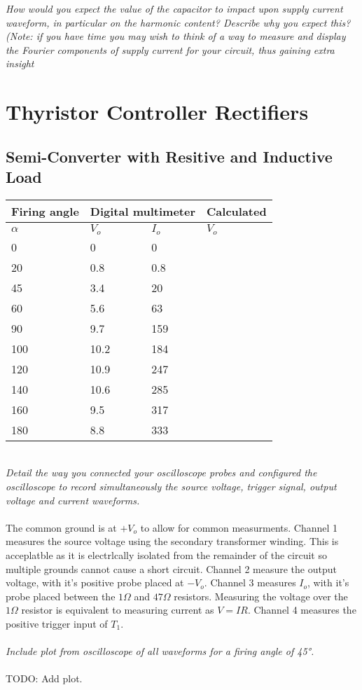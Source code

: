 \documentclass[12pt,a4paper]{article}
\begin{document}
\textit{How would you expect the value of the capacitor to impact upon supply current waveform, in
particular on the harmonic content? Describe why you expect this?
(Note: if you have time you may wish to think of a way to measure and display the Fourier
components of supply current for your circuit, thus gaining extra insight}\\
\section{Thyristor Controller Rectifiers}
\subsection{Semi-Converter with Resitive and Inductive Load}
\begin{center}
\begin{tabular}{|p{3cm}|p{2.5cm}|p{2.5cm}|p{2.5cm}|}
\hline
\centering\textbf{Firing angle} &
\multicolumn{2}{c|}{\textbf{Digital multimeter}} &
\centering\textbf{Calculated} \tabularnewline
\hline
\centering$\alpha$ & \centering$V_o$ & \centering$I_o$ & \centering$V_o$ \tabularnewline
\hline
0 & 0 & 0 & \\ \hline
20 & 0.8 & 0.8 & \\ \hline
45 & 3.4 & 20 & \\ \hline
60 & 5.6 & 63 & \\ \hline
90 & 9.7 & 159 & \\ \hline
100 & 10.2 & 184 & \\ \hline
120 & 10.9 & 247 & \\ \hline
140 & 10.6 & 285 & \\ \hline
160 & 9.5 & 317 & \\ \hline
180 & 8.8 & 333 & \\ \hline
\end{tabular}
\end{center}\\
\textit{Detail the way you connected your oscilloscope probes and configured the oscilloscope to record simultaneously the source voltage, trigger signal, output voltage and current waveforms.}\\\\
The common ground is at $+V_o$ to allow for common measurments. Channel 1 measures the source voltage using the secondary transformer winding. This is acceplatble as it is electrlcally isolated from the remainder of the circuit so multiple grounds cannot cause a short circuit. Channel 2 measure the output voltage, with it's positive probe placed at $-V_o$. Channel 3 measures $I_o$, with it's probe placed between the $1\Omega$ and $47\Omega$ resistors. Measuring the voltage over the $1\Omega$ resistor is equivalent to measuring current as $V=IR$. Channel 4 measures the positive trigger input of $T_1$. \\\\ 
\textit{Include plot from oscilloscope of all waveforms for a firing angle of 45°.}\\\\
TODO: Add plot.\\\\
\end{document}
